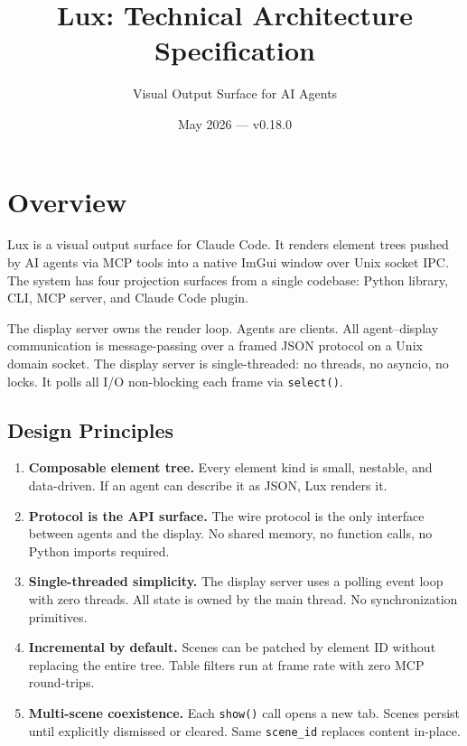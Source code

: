 \documentclass[a4paper,10pt]{article}
\newcommand{\tool}[1]{\texttt{#1}}
\newcommand{\field}[1]{\texttt{#1}}
\begin{document}
\title{Lux: Technical Architecture Specification}
\author{Visual Output Surface for AI Agents}
\date{May 2026 --- v0.18.0}
\maketitle

\tableofcontents
\newpage

\section{Overview}

Lux is a visual output surface for Claude Code.  It renders element
trees pushed by AI agents via MCP tools into a native ImGui window
over Unix socket IPC.  The system has four projection surfaces from
a single codebase: Python library, CLI, MCP server, and Claude Code
plugin.

The display server owns the render loop.  Agents are clients.  All
agent--display communication is message-passing over a framed JSON
protocol on a Unix domain socket.  The display server is
single-threaded: no threads, no asyncio, no locks.  It polls all
I/O non-blocking each frame via \texttt{select()}.

\subsection{Design Principles}

\begin{enumerate}[label=\textbf{P\arabic*}.]
  \item \textbf{Composable element tree.}  Every element kind is
    small, nestable, and data-driven.  If an agent can describe it
    as JSON, Lux renders it.
  \item \textbf{Protocol is the API surface.}  The wire protocol is
    the only interface between agents and the display.  No shared
    memory, no function calls, no Python imports required.
  \item \textbf{Single-threaded simplicity.}  The display server
    uses a polling event loop with zero threads.  All state is owned
    by the main thread.  No synchronization primitives.
  \item \textbf{Incremental by default.}  Scenes can be patched by
    element ID without replacing the entire tree.  Table filters run
    at frame rate with zero MCP round-trips.
  \item \textbf{Multi-scene coexistence.}  Each \tool{show()} call
    opens a new tab.  Scenes persist until explicitly dismissed or
    cleared.  Same \field{scene\_id} replaces content in-place.
\end{enumerate}
\end{document}
